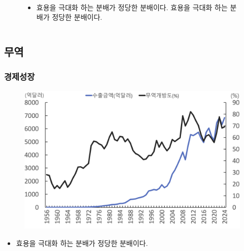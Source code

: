 \documentclass[aspectratio=169,xcolor=dvipsnames,handout]{beamer}
\begin{document}
\begin{frame}
\begin{columns}
\begin{column}{.5\textwidth}
\begin{figure}
            \\
            \begin{itemize}[<+->]
                \item 효용을 극대화 하는 분배가 정당한 분배이다. 효용을 극대화 하는 분배가 정당한 분배이다.
            \end{itemize}
        \end{figure}
    \end{column}
\end{columns}
\end{frame}

\subsection{무역}
\begin{frame}[<+->]
\frametitle{경제성장}
    \begin{figure}
        \centering
        \includegraphics[width=.55\textwidth]{pic/fig_econ_05.png}
    \end{figure}
    \begin{itemize}
        \item 효용을 극대화 하는 분배가 정당한 분배이다.
    \end{itemize}
\end{frame}
\end{document}
